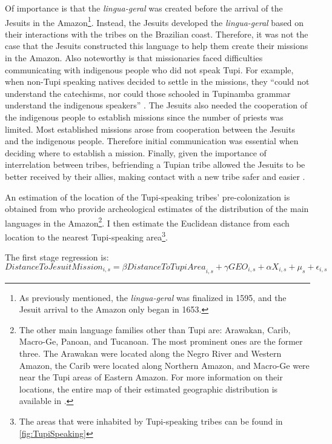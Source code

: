 \documentclass{article}
\begin{document}
Of importance is that the \textit{lingua-geral} was created before the arrival of the Jesuits in the Amazon\footnote{
  As previously mentioned, the \textit{lingua-geral} was finalized in 1595, and the Jesuit arrival to the Amazon only began in 1653.}. 
Instead, the Jesuits developed the \textit{lingua-geral} based on their interactions with the tribes on the Brazilian coast. 
Therefore, it was not the case that the Jesuits constructed this language to help them create their missions in the Amazon. 
Also noteworthy is that missionaries faced difficulties communicating with indigenous people who did not speak Tupi. 
For example, when non-Tupi speaking natives decided to settle in the missions, they “could not understand the catechisms, nor could those schooled in Tupinamba grammar understand the indigenous speakers” \parencite{Mufwene2014-gx}. 
The Jesuits also needed the cooperation of the indigenous people to establish missions since the number of priests was limited. Most established missions arose from cooperation between the Jesuits and the indigenous people.
Therefore initial communication was essential when deciding where to establish a mission. 
Finally, given the importance of interrelation between tribes, befriending a Tupian tribe allowed the Jesuits to be better received by their allies, making contact with a new tribe safer and easier \parencite{Reeve1993-wy}.

An estimation of the location of the Tupi-speaking tribes' pre-colonization is obtained from \textcite{Clement2015-rf, Eriksen2011-cv} who provide archeological estimates of the distribution of the main languages in the Amazon\footnote{The other main language families other than Tupi are: Arawakan, Carib, Macro-Ge, Panoan, and Tucanoan. The most prominent ones are the former three. The Arawakan were located along the Negro River and Western Amazon, the Carib were located along Northern Amazon, and Macro-Ge were near the Tupi areas of Eastern Amazon. For more information on their locations, the entire map of their estimated geographic distribution is available in \textcite{Clement2015-rf}.}.
I then estimate the Euclidean distance from each location to the nearest Tupi-speaking area\footnote{
  The areas that were inhabited by Tupi-speaking tribes can be found in \autoref{fig:TupiSpeaking}}.

The first stage regression is:
\begin{equation}
\label{eqn:firststage}
	\textit{DistanceToJesuitMission}_{i,s} = \beta \textit{DistanceToTupiArea}_{i,s} + \gamma \textit{GEO}_{i,s} +  \alpha \textit{X}_{i,s} + \mu_s + \epsilon_{i,s}
\end{equation}
\end{document}
